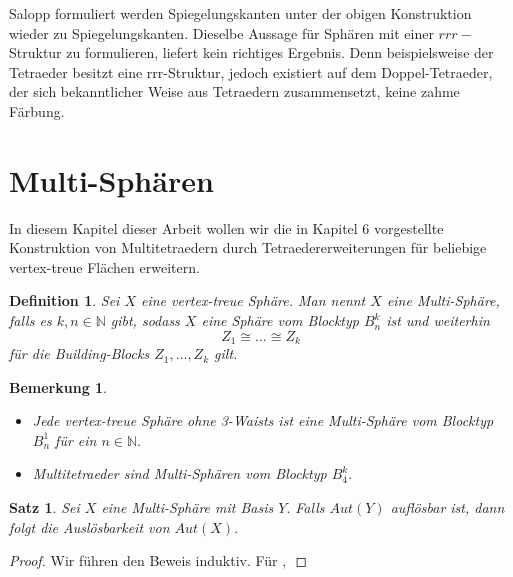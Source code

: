 \documentclass[12pt,titlepage,twoside,cleardoublepage]{article}
\theoremstyle{nummermitklammern}
\newtheorem{definition}[temp]{Definition}
\newtheorem{bemerkung}[temp]{Bemerkung}
\newtheorem{satz}[temp]{Satz}
\newtheorem{definition}[zahl]{Definition}
\newtheorem{bemerkung}[zahl]{Bemerkung}
\newtheorem{satz}[zahl]{Satz}
\numberwithin{equation}{section}
\begin{document}
Salopp formuliert werden Spiegelungskanten unter der obigen Konstruktion wieder zu Spiegelungskanten.
Dieselbe Aussage für Sphären mit einer $rrr-$Struktur zu formulieren, liefert kein richtiges Ergebnis. Denn beispielsweise der Tetraeder besitzt eine rrr-Struktur, jedoch existiert auf dem Doppel-Tetraeder, der sich bekanntlicher Weise aus Tetraedern zusammensetzt, keine zahme Färbung.
\section{Multi-Sphären}
In diesem Kapitel dieser Arbeit wollen wir die in Kapitel 6 vorgestellte Konstruktion von Multitetraedern durch Tetraedererweiterungen für beliebige vertex-treue Flächen erweitern.   
\begin{definition}
Sei $X$ eine vertex-treue Sphäre. Man nennt $X$ eine \emph{Multi-Sphäre}, falls es $k,n \in \mathbb{N}$ gibt, sodass $X$ eine Sphäre vom Blocktyp $B_n^k$ ist und weiterhin
\[
Z_1\cong \ldots\cong Z_k
\]
für die Building-Blocks $Z_1,\ldots,Z_k$ gilt. 
\end{definition}
\begin{bemerkung}
\begin{itemize}
\item Jede vertex-treue Sphäre ohne 3-Waists ist eine Multi-Sphäre vom Blocktyp $B_n^1$ für ein $n\in \mathbb{N}.$
\item Multitetraeder sind Multi-Sphären vom Blocktyp $B_4^k.$
\end{itemize}
\end{bemerkung}
\begin{satz}
Sei $X$ eine Multi-Sphäre mit Basis $Y.$ Falls $Aut(Y)$ auflösbar ist, dann folgt die Auslösbarkeit von $Aut(X).$ 
\end{satz}
\begin{proof}
Wir führen den Beweis induktiv. Für $,$
\end{proof}
\end{document}
